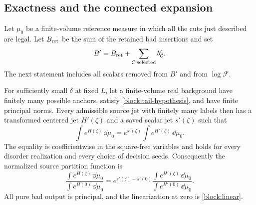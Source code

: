 \subsection{Exactness and the connected expansion}

Let $\mu_0$ be a finite-volume reference measure in which all the cuts
just described are legal.  Let $B_{\rm ret}$ be the sum of the retained
bad insertions and set
\[
 B'=B_{\rm ret}+\sum_{\mathcal C\text{ selected}}b'_{\mathcal C}.
\]
The next statement includes all scalars removed from $B'$ and from
$\log\mathcal F$.

\begin{proposition}
\label{block:exact}
For sufficiently small $\delta$ at fixed $L$, let a finite-volume real
background have finitely many possible anchors, satisfy
\eqref{block:tail-hypothesis}, and have finite principal norms.  Every
admissible source jet with finitely many labels then has a transformed
centered jet $H'(\zeta)$ and a saved scalar jet $s'(\zeta)$ such that
\begin{equation}
 \int e^{H(\zeta)}\,\dd\mu_0
       =e^{s'(\zeta)}\int e^{H'(\zeta)}\,\dd\mu_0.
 \label{block:partition-identity}
\end{equation}
The equality is coefficientwise in the square-free variables and holds
for every disorder realization and every choice of decision seeds.
Consequently the normalized source partition function is
\begin{equation}
 \frac{\int e^{H(\zeta)}\,\dd\mu_0}{\int e^{H(0)}\,\dd\mu_0}
 =e^{s'(\zeta)-s'(0)}
   \frac{\int e^{H'(\zeta)}\,\dd\mu_0}{\int e^{H'(0)}\,\dd\mu_0}.
 \label{block:normalized-identity}
\end{equation}
All pure bad output is principal, and the linearization at zero is
\eqref{block:linear}.
\end{proposition}

